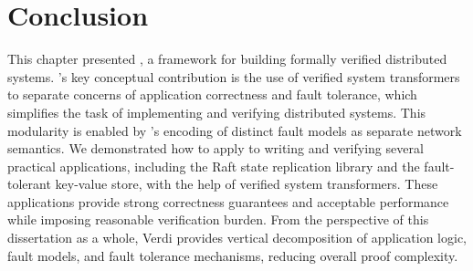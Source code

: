 \section{Conclusion}\label{sec:verdi:conclusion}

This chapter presented \Verdi, a framework for building formally
verified distributed systems.  \Verdi's key conceptual contribution is
the use of verified system transformers to separate concerns of
application correctness and fault tolerance, which simplifies the task
of implementing and verifying distributed systems. This
modularity is enabled by \Verdi's encoding of distinct fault models as
separate network semantics.  We demonstrated how to apply \Verdi to
writing and verifying several practical applications, including the
Raft state replication library and the \vard fault-tolerant key-value
store, with the help of verified system transformers.  These
applications provide strong correctness guarantees and acceptable
performance while imposing reasonable verification burden.
From the perspective of this dissertation as a whole,
  Verdi provides vertical decomposition of
    application logic, fault models, and fault tolerance mechanisms,
  reducing overall proof complexity.
